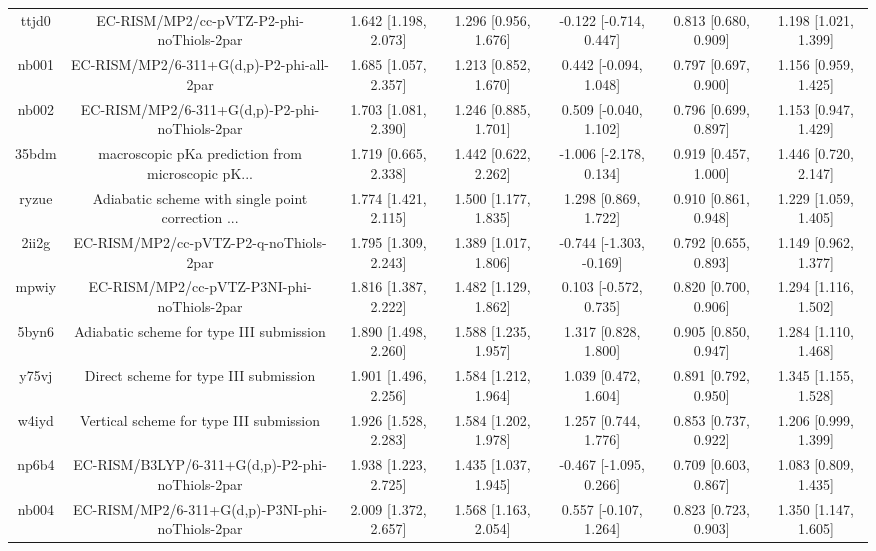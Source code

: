 \documentclass{article}
\begin{document}
\begin{center}
\begin{longtable}{|ccccccc|}
 ttjd0 &           EC-RISM/MP2/cc-pVTZ-P2-phi-noThiols-2par &  1.642 [1.198, 2.073] &  1.296 [0.956, 1.676] &   -0.122 [-0.714, 0.447] &  0.813 [0.680, 0.909] &   1.198 [1.021, 1.399] \\
 nb001 &           EC-RISM/MP2/6-311+G(d,p)-P2-phi-all-2par &  1.685 [1.057, 2.357] &  1.213 [0.852, 1.670] &    0.442 [-0.094, 1.048] &  0.797 [0.697, 0.900] &   1.156 [0.959, 1.425] \\
 nb002 &      EC-RISM/MP2/6-311+G(d,p)-P2-phi-noThiols-2par &  1.703 [1.081, 2.390] &  1.246 [0.885, 1.701] &    0.509 [-0.040, 1.102] &  0.796 [0.699, 0.897] &   1.153 [0.947, 1.429] \\
 35bdm &  macroscopic pKa prediction from microscopic pK... &  1.719 [0.665, 2.338] &  1.442 [0.622, 2.262] &   -1.006 [-2.178, 0.134] &  0.919 [0.457, 1.000] &   1.446 [0.720, 2.147] \\
 ryzue &  Adiabatic scheme with single point correction ... &  1.774 [1.421, 2.115] &  1.500 [1.177, 1.835] &     1.298 [0.869, 1.722] &  0.910 [0.861, 0.948] &   1.229 [1.059, 1.405] \\
 2ii2g &             EC-RISM/MP2/cc-pVTZ-P2-q-noThiols-2par &  1.795 [1.309, 2.243] &  1.389 [1.017, 1.806] &  -0.744 [-1.303, -0.169] &  0.792 [0.655, 0.893] &   1.149 [0.962, 1.377] \\
 mpwiy &         EC-RISM/MP2/cc-pVTZ-P3NI-phi-noThiols-2par &  1.816 [1.387, 2.222] &  1.482 [1.129, 1.862] &    0.103 [-0.572, 0.735] &  0.820 [0.700, 0.906] &   1.294 [1.116, 1.502] \\
 5byn6 &           Adiabatic scheme for type III submission &  1.890 [1.498, 2.260] &  1.588 [1.235, 1.957] &     1.317 [0.828, 1.800] &  0.905 [0.850, 0.947] &   1.284 [1.110, 1.468] \\
 y75vj &              Direct scheme for type III submission &  1.901 [1.496, 2.256] &  1.584 [1.212, 1.964] &     1.039 [0.472, 1.604] &  0.891 [0.792, 0.950] &   1.345 [1.155, 1.528] \\
 w4iyd &            Vertical scheme for type III submission &  1.926 [1.528, 2.283] &  1.584 [1.202, 1.978] &     1.257 [0.744, 1.776] &  0.853 [0.737, 0.922] &   1.206 [0.999, 1.399] \\
 np6b4 &    EC-RISM/B3LYP/6-311+G(d,p)-P2-phi-noThiols-2par &  1.938 [1.223, 2.725] &  1.435 [1.037, 1.945] &   -0.467 [-1.095, 0.266] &  0.709 [0.603, 0.867] &   1.083 [0.809, 1.435] \\
 nb004 &    EC-RISM/MP2/6-311+G(d,p)-P3NI-phi-noThiols-2par &  2.009 [1.372, 2.657] &  1.568 [1.163, 2.054] &    0.557 [-0.107, 1.264] &  0.823 [0.723, 0.903] &   1.350 [1.147, 1.605] \\

\end{longtable}
\end{center}
\end{document}
